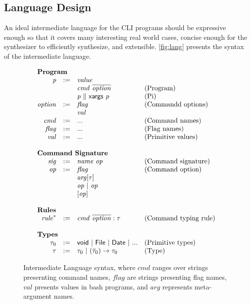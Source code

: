 \subsection{Language Design}
\label{subsec:represent}
An ideal intermediate language for the CLI programs should be expressive enough so that it covers many interesting real world cases, concise enough for the synthesizer to efficiently synthesize, and extensible. \autoref{fig:lang} presents the syntax of the intermediate language.

\begin{figure}[ht]
\[
\begin{array}{rlll}
\multicolumn{3}{l}{\textbf{Program}}\\
\mathit{p} & := & \mathit{value} \\
    &  & \mathit{cmd}~\overline{\mathit{option}} & \textrm{(Program)}\\
    &  & \mathit{p} ~\|~ \mathsf{xargs} ~\mathit{p} & \textrm{(Pi)} \\
\mathit{option} & := & \mathit{flag} & \textrm{(Commandd options)}\\
                &    & \mathit{val}\\
\mathit{cmd} & := & ... & \textrm{(Command names)}\\
\mathit{flag} & := & ... & \textrm{(Flag names)}\\
\mathit{val} & := & ...  & \textrm{(Primitive values)}\\
~\\
\multicolumn{3}{l}{\textbf{Command Signature}}\\
\mathit{sig} & := & \mathit{name}~\mathit{op} & \textrm{(Command signature)}\\
\mathit{op} &:= & \mathit{flag} & \textrm{(Command option)}\\
                &   & \mathit{arg}[\tau]\\
                &   & \mathit{op}~|~\mathit{op}\\
                &   & [ \mathit{op} ]\\
~\\
\multicolumn{3}{l}{\textbf{Rules}}\\
\mathit{rule}^{*} &:=& \mathit{cmd}~\overline{\mathit{option}} : \tau & \textrm{(Command typing rule)}\\
~\\
\multicolumn{3}{l}{\textbf{Types}}\\
\tau_0 & := & \mathsf{void} ~|~ \mathsf{File} ~|~ \mathsf{Date} ~|~ ...& \textrm{(Primitive types)}\\
\tau & := & \tau_0 ~|~ (\bar{\tau}_0)\rightarrow \tau_0 & \textrm{(Type)}
\end{array}
\]
\caption{Intermediate Language syntax, where $\mathit{cmd}$ ranges over strings presernting command names, $\mathit{flag}$ are strings presenting flag names, $\mathit{val}$ presents values in bash programs, and $\mathit{arg}$ represents meta-argument names.}
\label{fig:lang}
\end{figure}


